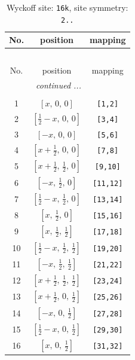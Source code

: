 \documentclass[fleqn,8pt]{jsarticle}
\begin{document}
\renewcommand{\arraystretch}{1.2}
\begin{longtable}{ccc}
\caption{Wyckoff site: {\tt 16k}, site symmetry: {\tt 2..}}
 \\
 \hline \hline
No. & position & mapping \\ \hline \endfirsthead

\multicolumn{2}{l}{\tablename\ \thetable{}} \\
 \hline \hline
No. & position & mapping \\ \hline \endhead

 \hline \hline
\multicolumn{2}{r}{\footnotesize\it continued ...} \\ \endfoot

 \hline \hline
\multicolumn{2}{r}{} \\ \endlastfoot

1 & $\left[ x,\, 0,\, 0 \right]$ & {\tt [1,2]} \\ \hline
2 & $\left[ \frac{1}{2} - x,\, 0,\, 0 \right]$ & {\tt [3,4]} \\ \hline
3 & $\left[ - x,\, 0,\, 0 \right]$ & {\tt [5,6]} \\ \hline
4 & $\left[ x + \frac{1}{2},\, 0,\, 0 \right]$ & {\tt [7,8]} \\ \hline
5 & $\left[ x + \frac{1}{2},\, \frac{1}{2},\, 0 \right]$ & {\tt [9,10]} \\ \hline
6 & $\left[ - x,\, \frac{1}{2},\, 0 \right]$ & {\tt [11,12]} \\ \hline
7 & $\left[ \frac{1}{2} - x,\, \frac{1}{2},\, 0 \right]$ & {\tt [13,14]} \\ \hline
8 & $\left[ x,\, \frac{1}{2},\, 0 \right]$ & {\tt [15,16]} \\ \hline
9 & $\left[ x,\, \frac{1}{2},\, \frac{1}{2} \right]$ & {\tt [17,18]} \\ \hline
10 & $\left[ \frac{1}{2} - x,\, \frac{1}{2},\, \frac{1}{2} \right]$ & {\tt [19,20]} \\ \hline
11 & $\left[ - x,\, \frac{1}{2},\, \frac{1}{2} \right]$ & {\tt [21,22]} \\ \hline
12 & $\left[ x + \frac{1}{2},\, \frac{1}{2},\, \frac{1}{2} \right]$ & {\tt [23,24]} \\ \hline
13 & $\left[ x + \frac{1}{2},\, 0,\, \frac{1}{2} \right]$ & {\tt [25,26]} \\ \hline
14 & $\left[ - x,\, 0,\, \frac{1}{2} \right]$ & {\tt [27,28]} \\ \hline
15 & $\left[ \frac{1}{2} - x,\, 0,\, \frac{1}{2} \right]$ & {\tt [29,30]} \\ \hline
16 & $\left[ x,\, 0,\, \frac{1}{2} \right]$ & {\tt [31,32]} \\
\end{longtable}
\end{document}
